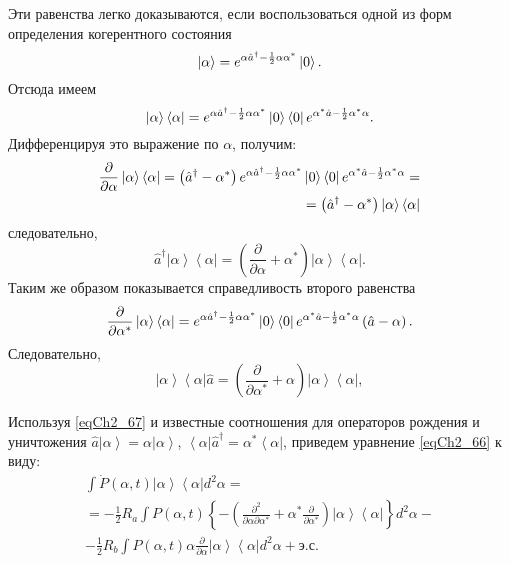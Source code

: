 Эти равенства легко доказываются, если воспользоваться одной из форм
определения когерентного состояния
\[
\left|\alpha\right> = e^{\alpha \hat{a}^{\dag} -
  \frac{1}{2}\alpha\alpha^{*}} \ket{0}.
\]
Отсюда имеем 
\[
\left|\alpha\right>\left<\alpha\right| = e^{\alpha \hat{a}^{\dag} -
  \frac{1}{2}\alpha\alpha^{*}} \ket{0}
\bra{0}e^{\alpha^{*} \hat{a} -
  \frac{1}{2}\alpha^{*}\alpha}.
\]
Дифференцируя это выражение по $\alpha$,  получим:
\begin{eqnarray}
\frac{\partial}{\partial \alpha}\left|\alpha\right>\left<\alpha\right|
= \left(\hat{a}^{\dag} -
\alpha^{*}\right) e^{\alpha \hat{a}^{\dag} -
  \frac{1}{2}\alpha\alpha^{*}} \ket{0}
\bra{0}e^{\alpha^{*} \hat{a} -
  \frac{1}{2}\alpha^{*}\alpha} = 
\nonumber \\
= \left(\hat{a}^{\dag} -
\alpha^{*}\right)\left|\alpha\right>\left<\alpha\right| 
\nonumber
\end{eqnarray}
следовательно,
\begin{equation}
\hat{a}^{\dag}\left|\alpha\right>\left<\alpha\right| = 
\left(\frac{\partial}{\partial \alpha} +
\alpha^{*}\right)\left|\alpha\right>\left<\alpha\right|.
\label{eqCh2_68}
\end{equation}
Таким же образом показывается справедливость второго равенства
\begin{eqnarray}
\frac{\partial}{\partial \alpha^{*}}\left|\alpha\right>\left<\alpha\right|
=  e^{\alpha \hat{a}^{\dag} -
  \frac{1}{2}\alpha\alpha^{*}} \ket{0}
\bra{0}e^{\alpha^{*} \hat{a} -
  \frac{1}{2}\alpha^{*}\alpha} 
\left(\hat{a} -
\alpha\right). 
\nonumber
\end{eqnarray}
Следовательно,
\begin{equation}
\left|\alpha\right>\left<\alpha\right|\hat{a} = 
\left(\frac{\partial}{\partial \alpha^{*}} +
\alpha\right)\left|\alpha\right>\left<\alpha\right|, 
\label{eqCh2_68a}
\end{equation}

Используя \eqref{eqCh2_67} и известные соотношения для операторов рождения и
уничтожения  $\hat{a}\left|\alpha\right> = \alpha\left|\alpha\right>$,
$\left<\alpha\right|\hat{a}^{\dag} = \alpha^{*}\left<\alpha\right|$,
приведем уравнение \eqref{eqCh2_66} к виду:   
\begin{eqnarray}
\int \dot{P}\left(\alpha,
t\right)\left|\alpha\right>\left<\alpha\right| d^2 \alpha  = 
\nonumber \\
= -\frac{1}{2}R_a\int
P\left(\alpha,t\right)
\left\{
-\left(
\frac{\partial^2}{\partial \alpha \partial \alpha^{*}} +
\alpha^{*}\frac{\partial}{\partial \alpha^{*}}
\right)
\left|\alpha\right>\left<\alpha\right| 
\right\}
d^2 \alpha - 
\nonumber \\
-\frac{1}{2}R_b\int P\left(\alpha,t\right)
\alpha \frac{\partial}{\partial \alpha}
\left|\alpha\right>\left<\alpha\right| 
d^2 \alpha + \mbox{э.с.}
\label{eqCh2_69}
\end{eqnarray}

